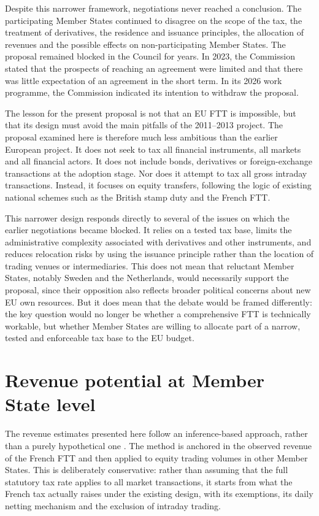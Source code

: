 \documentclass[../../main]{subfiles}
\begin{document}
Despite this narrower framework, negotiations never reached a conclusion. The participating Member States continued to disagree on the scope of the tax, the treatment of derivatives, the residence and issuance principles, the allocation of revenues and the possible effects on non-participating Member States. The proposal remained blocked in the Council for years. In 2023, the Commission stated that the prospects of reaching an agreement were limited and that there was little expectation of an agreement in the short term. In its 2026 work programme, the Commission indicated its intention to withdraw the proposal.

The lesson for the present proposal is not that an EU FTT is impossible, but that its design must avoid the main pitfalls of the 2011--2013 project. The proposal examined here is therefore much less ambitious than the earlier European project. It does not seek to tax all financial instruments, all markets and all financial actors. It does not include bonds, derivatives or foreign-exchange transactions at the adoption stage. Nor does it attempt to tax all gross intraday transactions. Instead, it focuses on equity transfers, following the logic of existing national schemes such as the British stamp duty and the French FTT.

This narrower design responds directly to several of the issues on which the earlier negotiations became blocked. It relies on a tested tax base, limits the administrative complexity associated with derivatives and other instruments, and reduces relocation risks by using the issuance principle rather than the location of trading venues or intermediaries. This does not mean that reluctant Member States, notably Sweden and the Netherlands, would necessarily support the proposal, since their opposition also reflects broader political concerns about new EU own resources. But it does mean that the debate would be framed differently: the key question would no longer be whether a comprehensive FTT is technically workable, but whether Member States are willing to allocate part of a narrow, tested and enforceable tax base to the EU budget.

\section{Revenue potential at Member State level}

The revenue estimates presented here follow an inference-based approach, rather than a purely hypothetical one \citep{CapelleBlancardPersaud2025}. The method is anchored in the observed revenue of the French FTT and then applied to equity trading volumes in other Member States. This is deliberately conservative: rather than assuming that the full statutory tax rate applies to all market transactions, it starts from what the French tax actually raises under the existing design, with its exemptions, its daily netting mechanism and the exclusion of intraday trading.
\end{document}
